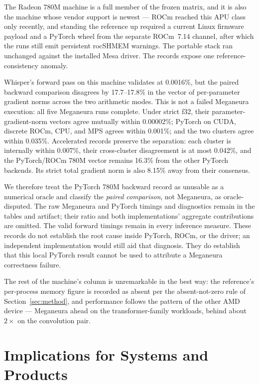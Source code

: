 \documentclass[10pt,twocolumn]{article}
\newcommand{\system}{Meganeura}
\begin{document}
The Radeon 780M machine is a full member of the frozen matrix, and it is
also the machine whose vendor support is newest --- ROCm reached this APU
class only recently, and standing the reference up required a current Linux
firmware payload and a PyTorch wheel from the separate ROCm~7.14 channel,
after which the runs still emit persistent rocSHMEM warnings. The portable
stack ran unchanged against the installed Mesa driver. The records expose one
reference-consistency anomaly.

Whisper's forward pass on this machine validates at 0.0016\%, but the paired
backward comparison disagrees by 17.7--17.8\% in the vector of per-parameter
gradient norms across the two arithmetic modes. This is not a failed
\system{} execution: all five \system{} runs complete. Under strict f32,
their parameter-gradient-norm vectors agree mutually within 0.00002\%; PyTorch on CUDA,
discrete ROCm, CPU, and MPS agrees within 0.001\%; and the two clusters agree
within 0.035\%. Accelerated records preserve the separation: each cluster is
internally within 0.007\%, their cross-cluster disagreement is at most
0.042\%, and the PyTorch/ROCm 780M vector remains 16.3\% from the other
PyTorch backends. Its strict total gradient norm is also 8.15\% away from
their consensus.

We therefore treat the PyTorch 780M backward record as unusable as a
numerical oracle and classify the \emph{paired comparison}, not \system{}, as
oracle-disputed. The raw \system{} and PyTorch timings and diagnostics remain
in the tables and artifact; their ratio and both implementations' aggregate
contributions are omitted. The valid forward timings remain in every
inference measure. These records do not establish the root cause inside
PyTorch, ROCm, or the driver; an independent implementation would still aid
that diagnosis. They do establish that this local PyTorch result cannot be
used to attribute a \system{} correctness failure.

The rest of the machine's column is unremarkable in the best way: the
reference's per-process memory figure is recorded as absent per the
absent-not-zero rule of Section~\ref{sec:method}, and performance follows
the pattern of the other AMD device --- \system{} ahead on the
transformer-family workloads, behind about $2\times$ on the convolution
pair.

\section{Implications for Systems and Products}
\label{sec:implications}
\end{document}
